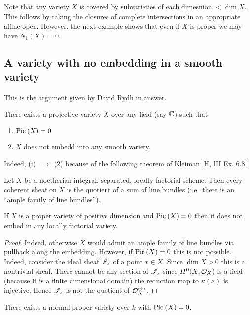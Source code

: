 \documentclass[12pt]{article}
\begin{document}
Note that any variety $X$ is covered by subvarieties of each dimesnion $< \dim{X}$. This follows by taking the closures of complete intersections in an appropriate affine open. However, the next example shows that even if $X$ is proper we may have $N_1(X) = 0$. 


\subsection{A variety with no embedding in a smooth variety}

This is the argument given by David Rydh in  answer.

There exists a projective variety $X$ over any field (say $\mathbb{C}$) such that
\begin{enumerate}
\item $\mathrm{Pic}^{} \left( X \right) = 0$
\item $X$ does not embedd into any smooth variety.
\end{enumerate}

Indeed, (i) $\implies$ (2) because of the following theorem of Kleiman [H, III Ex. 6.8]
\begin{theorem}
Let $X$ be a noetherian integral, separated, locally factorial scheme. Then every coherent sheaf on $X$ is the quotient of a sum of line bundles (i.e.\ there is an ``ample family of line bundles'').
\end{theorem}

\begin{cor}
If $X$ is a proper variety of positive dimension and $\mathrm{Pic}^{} \left( X \right) = 0$ then it does not embed in any locally factorial variety.
\end{cor}

\begin{proof}
Indeed, otherwise $X$ would admit an ample family of line bundles via pullback along the embedding. However, if $\mathrm{Pic}^{} \left( X \right) = 0$ this is not possible. Indeed, consider the ideal sheaf $\mathscr{I}_x$ of a point $x \in X$. Since $\dim{X} > 0$ this is a nontrivial sheaf. There cannot be any section of $\mathscr{I}_x$ since $H^0(X, \mathcal{O}_{X})$ is a field (because it is a finite dimensional domain) the reduction map to $\kappa(x)$ is injective. Hence $\mathscr{I}_x$ is not the quotient of $\mathcal{O}_{X}^{\oplus n}$.
\end{proof}

\begin{theorem}
There exists a normal proper variety over $k$ with $\mathrm{Pic}^{} \left( X \right) = 0$.
\end{theorem}
\end{document}
